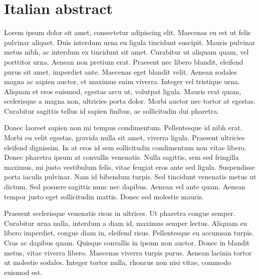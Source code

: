 \chapter*{Italian abstract}

Lorem ipsum dolor sit amet, consectetur adipiscing elit. Maecenas eu est ut felis pulvinar aliquet. Duis interdum urna eu ligula tincidunt suscipit. Mauris pulvinar metus nibh, ac interdum ex tincidunt sit amet. Curabitur ut aliquam quam, vel porttitor urna. Aenean non pretium erat. Praesent nec libero blandit, eleifend purus sit amet, imperdiet ante. Maecenas eget blandit velit. Aenean sodales magna ac sapien auctor, et maximus enim viverra. Integer vel tristique urna. Aliquam et eros euismod, egestas arcu ut, volutpat ligula. Mauris erat quam, scelerisque a magna non, ultricies porta dolor. Morbi auctor nec tortor at egestas. Curabitur sagittis tellus id sapien finibus, ac sollicitudin dui pharetra.

Donec laoreet sapien non mi tempus condimentum. Pellentesque id nibh erat. Morbi eu velit egestas, gravida nulla sit amet, viverra ligula. Praesent ultricies eleifend dignissim. In at eros id sem sollicitudin condimentum non vitae libero. Donec pharetra ipsum at convallis venenatis. Nulla sagittis, sem sed fringilla maximus, mi justo vestibulum felis, vitae feugiat eros ante sed ligula. Suspendisse porta iaculis pulvinar. Nam id bibendum turpis. Sed tincidunt venenatis metus ut dictum. Sed posuere sagittis nunc nec dapibus. Aenean vel ante quam. Aenean tempor justo eget sollicitudin mattis. Donec sed molestie mauris.

Praesent scelerisque venenatis risus in ultrices. Ut pharetra congue semper. Curabitur urna nulla, interdum a diam id, maximus semper lectus. Aliquam eu libero imperdiet, congue diam in, eleifend risus. Pellentesque eu accumsan turpis. Cras ac dapibus quam. Quisque convallis in ipsum non auctor. Donec in blandit metus, vitae viverra libero. Maecenas viverra turpis purus. Aenean lacinia tortor ut molestie sodales. Integer tortor nulla, rhoncus non nisi vitae, commodo euismod est. 